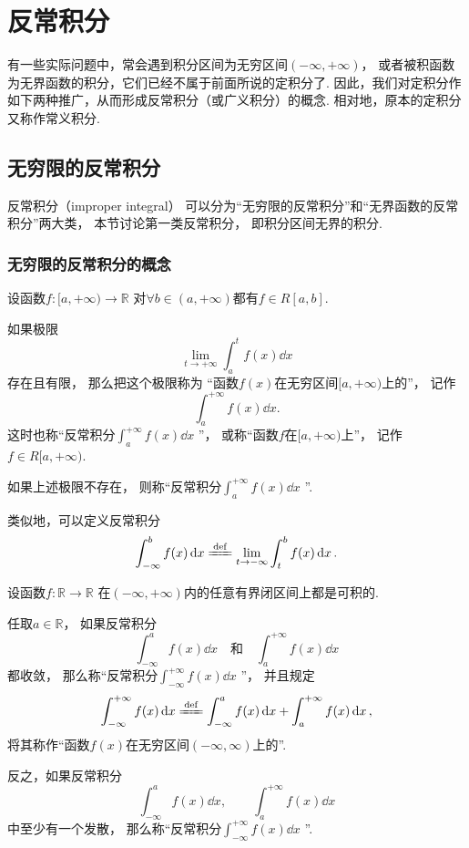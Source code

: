 \chapter{反常积分}
有一些实际问题中，常会遇到积分区间为无穷区间\((-\infty,+\infty)\)，
或者被积函数为无界函数的积分，它们已经不属于前面所说的定积分了.
因此，我们对定积分作如下两种推广，从而形成反常积分（或广义积分）的概念.
相对地，原本的定积分又称作常义积分.

\section{无穷限的反常积分}
反常积分（improper integral）
可以分为“无穷限的反常积分”和“无界函数的反常积分”两大类，
本节讨论第一类反常积分，
即积分区间无界的积分.

\subsection{无穷限的反常积分的概念}
\begin{definition}\label{definition:定积分.无穷限的反常积分的定义1}
设函数\(f\colon[a,+\infty)\to\mathbb{R}\)
对\(\forall b\in(a,+\infty)\)都有\(f \in R[a,b]\).

如果极限\[
	\lim\limits_{t \to +\infty} \int_a^t f(x) \dd{x}
\]存在且有限，
那么把这个极限称为
“函数\(f(x)\)在无穷区间\([a,+\infty)\)上的”，
记作\[
	\int_a^{+\infty} f(x) \dd{x}.
\]
这时也称“反常积分\(\int_a^{+\infty} f(x) \dd{x}\) ”，
或称“函数\(f\)在\([a,+\infty)\)上”，
记作\(f \in R[a,+\infty)\).

如果上述极限不存在，
则称“反常积分\(\int_a^{+\infty} f(x) \dd{x}\) ”.
\end{definition}

类似地，可以定义反常积分\[
	\int_{-\infty}^b f(x) \dd{x}
	\defeq
	\lim\limits_{t \to -\infty} \int_t^b f(x) \dd{x}.
\]

\begin{definition}\label{definition:定积分.无穷限的反常积分的定义3}
设函数\(f\colon\mathbb{R}\to\mathbb{R}\)
在\((-\infty,+\infty)\)内的任意有界闭区间上都是可积的.

任取\(a\in\mathbb{R}\)，
如果反常积分\[
	\int_{-\infty}^a f(x) \dd{x}
	\quad\text{和}\quad
	\int_a^{+\infty} f(x) \dd{x}
\]都收敛，
那么称“反常积分\(\int_{-\infty}^{+\infty} f(x) \dd{x}\) ”，
并且规定\[
	\int_{-\infty}^{+\infty} f(x) \dd{x}
	\defeq
	\int_{-\infty}^a f(x) \dd{x} + \int_a^{+\infty} f(x) \dd{x},
\]
将其称作“函数\(f(x)\)在无穷区间\((-\infty,\infty)\)上的”.

反之，如果反常积分\[
	\int_{-\infty}^a f(x) \dd{x}, \qquad
	\int_a^{+\infty} f(x) \dd{x}
\]中至少有一个发散，
那么称“反常积分\(\int_{-\infty}^{+\infty} f(x) \dd{x}\) ”.
\end{definition}

